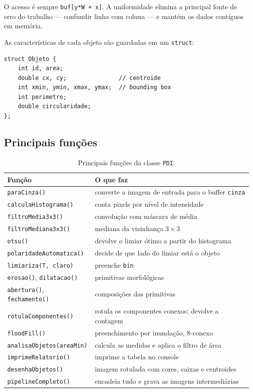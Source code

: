 \documentclass[12pt,a4paper]{article}
\begin{document}
O acesso é sempre \texttt{buf[y*W + x]}. A uniformidade elimina a principal
fonte de erro do trabalho --- confundir linha com coluna --- e mantém os dados
contíguos em memória.

As características de cada objeto são guardadas em um \texttt{struct}:

\begin{lstlisting}
struct Objeto {
    int id, area;
    double cx, cy;               // centroide
    int xmin, ymin, xmax, ymax;  // bounding box
    int perimetro;
    double circularidade;
};
\end{lstlisting}

\subsection{Principais funções}

\begin{table}[H]
\centering
\small
\begin{tabular}{ll}
\toprule
\textbf{Função} & \textbf{O que faz} \\
\midrule
\texttt{paraCinza()}            & converte a imagem de entrada para o buffer \texttt{cinza} \\
\texttt{calculaHistograma()}    & conta pixels por nível de intensidade \\
\texttt{filtroMedia3x3()}       & convolução com máscara de média \\
\texttt{filtroMediana3x3()}     & mediana da vizinhança $3\times3$ \\
\texttt{otsu()}                 & devolve o limiar ótimo a partir do histograma \\
\texttt{polaridadeAutomatica()} & decide de que lado do limiar está o objeto \\
\texttt{limiariza(T, claro)}    & preenche \texttt{bin} \\
\texttt{erosao()}, \texttt{dilatacao()} & primitivas morfológicas \\
\texttt{abertura()}, \texttt{fechamento()} & composições das primitivas \\
\texttt{rotulaComponentes()}    & rotula os componentes conexos; devolve a contagem \\
\texttt{floodFill()}            & preenchimento por inundação, 8-conexo \\
\texttt{analisaObjetos(areaMin)}& calcula as medidas e aplica o filtro de área \\
\texttt{imprimeRelatorio()}     & imprime a tabela no console \\
\texttt{desenhaObjetos()}       & imagem rotulada com cores, caixas e centroides \\
\texttt{pipelineCompleto()}     & encadeia tudo e grava as imagens intermediárias \\
\bottomrule
\end{tabular}
\caption{Principais funções da classe \texttt{PDI}.}
\end{table}
\end{document}

